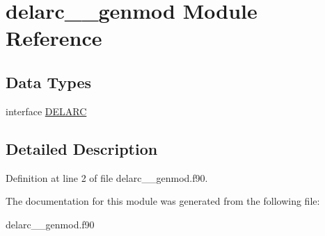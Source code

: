 \hypertarget{classdelarc____genmod}{\section{delarc\+\_\+\+\_\+genmod Module Reference}
\label{classdelarc____genmod}
}
\subsection*{Data Types}
\begin{DoxyCompactItemize}
\item 
interface \hyperlink{interfacedelarc____genmod_1_1_d_e_l_a_r_c}{D\+E\+L\+A\+R\+C}
\end{DoxyCompactItemize}


\subsection{Detailed Description}


Definition at line 2 of file delarc\+\_\+\+\_\+genmod.\+f90.



The documentation for this module was generated from the following file\+:\begin{DoxyCompactItemize}
\item 
delarc\+\_\+\+\_\+genmod.\+f90\end{DoxyCompactItemize}
